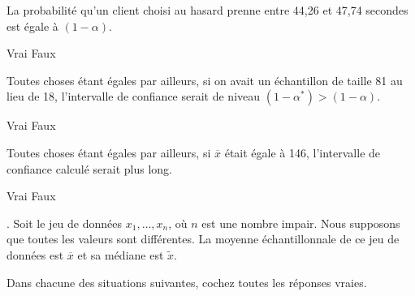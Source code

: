 \begin{questions}
\begin{parts}
    \begin{subparts}
        \subpart[1] La probabilité qu'un client choisi au hasard prenne entre 44,26 et 47,74 secondes est égale à $(1-\alpha)$.
        
        \begin{oneparcheckboxes}
            \choice Vrai
            \correctchoice Faux
        \end{oneparcheckboxes}
\vspace{0.5cm}

        \subpart[1] Toutes choses étant égales par ailleurs, si on avait un échantillon de taille 81 au lieu de 18, l'intervalle de confiance serait de niveau $(1-\alpha^*)>(1-\alpha)$.
        
        \begin{oneparcheckboxes}
            \choice Vrai
            \correctchoice Faux
        \end{oneparcheckboxes}
 \vspace{0.5cm}

        \subpart[1] Toutes choses étant égales par ailleurs, si $\overline{x}$ était égale à 146, l'intervalle de confiance calculé serait plus long.
        
        \begin{oneparcheckboxes}
            \choice Vrai
            \correctchoice Faux
        \end{oneparcheckboxes}       
    \end{subparts}
\end{parts}
\newpage
.
\newpage
\question Soit le jeu de données $x_1,\hdots,x_n$, où $n$ est une nombre impair. Nous supposons que toutes les valeurs sont différentes. La moyenne échantillonnale de ce jeu de données est $\overline{x}$ et sa médiane est $\widetilde{x}$.

Dans chacune des situations suivantes, cochez toutes les réponses vraies.
\end{questions}
